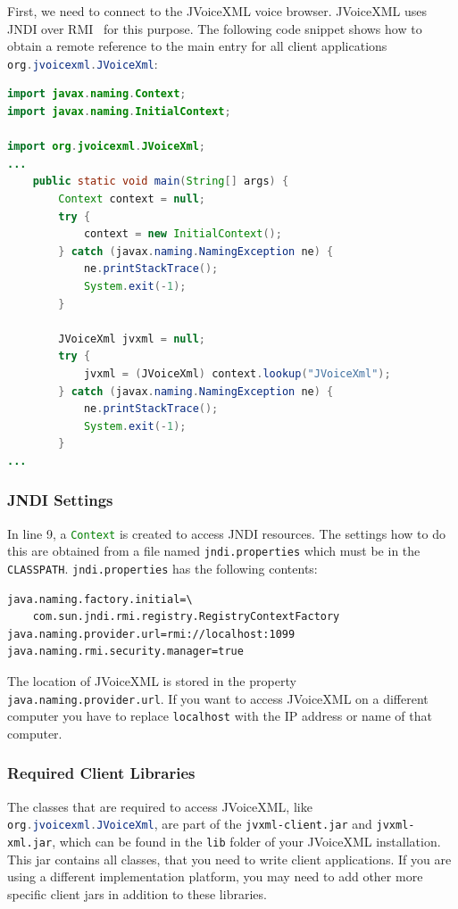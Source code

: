 \documentclass[11pt,a4paper]{book}
\begin{document}
First, we need to connect to the JVoiceXML voice browser. JVoiceXML
uses JNDI over RMI~\cite{sun:rmi,sun:rmi_jndi} for this purpose. 
The following code snippet
shows how to obtain a remote reference to the main entry for
all client applications \lstinline[language=Java]{org.jvoicexml.JVoiceXml}:

\begin{lstlisting}[language=Java]
import javax.naming.Context;
import javax.naming.InitialContext;

import org.jvoicexml.JVoiceXml;
...
    public static void main(String[] args) {
        Context context = null;
        try {
            context = new InitialContext();
        } catch (javax.naming.NamingException ne) {
            ne.printStackTrace();
            System.exit(-1);
        }

        JVoiceXml jvxml = null;
        try {
            jvxml = (JVoiceXml) context.lookup("JVoiceXml");
        } catch (javax.naming.NamingException ne) {
            ne.printStackTrace();
            System.exit(-1);
        }
...
\end{lstlisting}

\subsubsection{JNDI Settings}

In line 9, a \lstinline[language=Java]{Context} is created to access JNDI resources.
The settings how to do this are obtained from a file named
\texttt{jndi.properties} which must be in the \texttt{CLASSPATH}.
\texttt{jndi.properties} has the following contents:

\begin{lstlisting}
java.naming.factory.initial=\
    com.sun.jndi.rmi.registry.RegistryContextFactory
java.naming.provider.url=rmi://localhost:1099
java.naming.rmi.security.manager=true
\end{lstlisting}

The location of JVoiceXML is stored in the property 
\texttt{java.naming.pro\-vider.url}. If you want to access JVoiceXML on a 
different computer you have to replace \texttt{localhost} with the IP address 
or name of that computer.

\subsubsection{Required Client Libraries}

The classes  that are required to access JVoiceXML, like
\lstinline[language=Java]{org.jvoicexml.JVoiceXml}, are part of the \texttt{jvxml-client.jar} and
\texttt{jvxml-xml.jar}, which can be found in the \texttt{lib} folder of your
JVoiceXML installation. This jar contains all classes, that you need to write
client applications. If you are using a different implementation platform, you
may need to add other more specific client jars in addition to these libraries.
\end{document}
